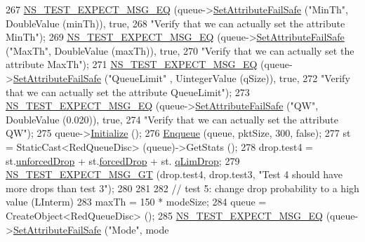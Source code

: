 \begin{DoxyCode}
267   \hyperlink{group__testing_ga7304ba46a28d8cf08dfdfd6499cf7068}{NS\_TEST\_EXPECT\_MSG\_EQ} (queue->\hyperlink{classns3_1_1ObjectBase_aa7d333004e970f925a4ed5df275541b5}{SetAttributeFailSafe} (\textcolor{stringliteral}{"MinTh"}, 
      DoubleValue (minTh)), \textcolor{keyword}{true},
268                          \textcolor{stringliteral}{"Verify that we can actually set the attribute MinTh"});
269   \hyperlink{group__testing_ga7304ba46a28d8cf08dfdfd6499cf7068}{NS\_TEST\_EXPECT\_MSG\_EQ} (queue->\hyperlink{classns3_1_1ObjectBase_aa7d333004e970f925a4ed5df275541b5}{SetAttributeFailSafe} (\textcolor{stringliteral}{"MaxTh"}, 
      DoubleValue (maxTh)), \textcolor{keyword}{true},
270                          \textcolor{stringliteral}{"Verify that we can actually set the attribute MaxTh"});
271   \hyperlink{group__testing_ga7304ba46a28d8cf08dfdfd6499cf7068}{NS\_TEST\_EXPECT\_MSG\_EQ} (queue->\hyperlink{classns3_1_1ObjectBase_aa7d333004e970f925a4ed5df275541b5}{SetAttributeFailSafe} (\textcolor{stringliteral}{"QueueLimit"}
      , UintegerValue (qSize)), \textcolor{keyword}{true},
272                          \textcolor{stringliteral}{"Verify that we can actually set the attribute QueueLimit"});
273   \hyperlink{group__testing_ga7304ba46a28d8cf08dfdfd6499cf7068}{NS\_TEST\_EXPECT\_MSG\_EQ} (queue->\hyperlink{classns3_1_1ObjectBase_aa7d333004e970f925a4ed5df275541b5}{SetAttributeFailSafe} (\textcolor{stringliteral}{"QW"}, 
      DoubleValue (0.020)), \textcolor{keyword}{true},
274                          \textcolor{stringliteral}{"Verify that we can actually set the attribute QW"});
275   queue->\hyperlink{classns3_1_1Object_af4411cb29971772fcd09203474a95078}{Initialize} ();
276   \hyperlink{classRedQueueDiscTestCase_a231b433374e4485d83bcca3088685e31}{Enqueue} (queue, pktSize, 300, \textcolor{keyword}{false});
277   st = StaticCast<RedQueueDisc> (queue)->GetStats ();
278   drop.test4 = st.\hyperlink{structns3_1_1RedQueueDisc_1_1Stats_a242027f6eb7d30e2cd636c52080e2c73}{unforcedDrop} + st.\hyperlink{structns3_1_1RedQueueDisc_1_1Stats_a56951fa215564c8d2e59aa046dc3e494}{forcedDrop} + st.
      \hyperlink{structns3_1_1RedQueueDisc_1_1Stats_a2374b8b8386ad6e42435bf1b29109bad}{qLimDrop};
279   \hyperlink{group__testing_ga6ba43672d44c1e85acfb1daf2af66612}{NS\_TEST\_EXPECT\_MSG\_GT} (drop.test4, drop.test3, \textcolor{stringliteral}{"Test 4 should have more drops than
       test 3"});
280 
281 
282   \textcolor{comment}{// test 5: change drop probability to a high value (LInterm)}
283   maxTh = 150 * modeSize;
284   queue = CreateObject<RedQueueDisc> ();
285   \hyperlink{group__testing_ga7304ba46a28d8cf08dfdfd6499cf7068}{NS\_TEST\_EXPECT\_MSG\_EQ} (queue->\hyperlink{classns3_1_1ObjectBase_aa7d333004e970f925a4ed5df275541b5}{SetAttributeFailSafe} (\textcolor{stringliteral}{"Mode"}, mode

\end{DoxyCode}
